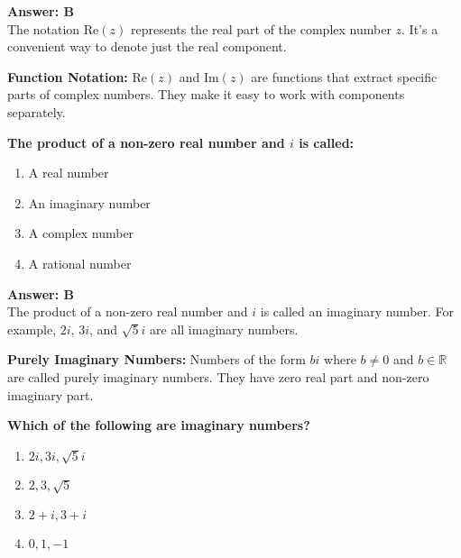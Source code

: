 \documentclass[12pt,a4paper]{article}
\begin{document}
\begin{answerstyle}
\textbf{Answer: B} \\
The notation \( \text{Re}(z) \) represents the real part of the complex number \( z \). It's a convenient way to denote just the real component.
\end{answerstyle}

\begin{conceptbox}
\textbf{Function Notation:} \( \text{Re}(z) \) and \( \text{Im}(z) \) are functions that extract specific parts of complex numbers. They make it easy to work with components separately.
\end{conceptbox}

\newpage
\begin{questiontitle}[MCQ 25]
\textbf{The product of a non-zero real number and \( i \) is called:}
\end{questiontitle}

\begin{partbox}[Options]
\begin{enumerate}[label=\Alph*.]
    \item A real number
    \item An imaginary number
    \item A complex number
    \item A rational number
\end{enumerate}
\end{partbox}

\begin{answerstyle}
\textbf{Answer: B} \\
The product of a non-zero real number and \( i \) is called an imaginary number. For example, \( 2i \), \( 3i \), and \( \sqrt{5}i \) are all imaginary numbers.
\end{answerstyle}

\begin{conceptbox}
\textbf{Purely Imaginary Numbers:} Numbers of the form \( bi \) where \( b \neq 0 \) and \( b \in \mathbb{R} \) are called purely imaginary numbers. They have zero real part and non-zero imaginary part.
\end{conceptbox}

\newpage
\begin{questiontitle}[MCQ 26]
\textbf{Which of the following are imaginary numbers?}
\end{questiontitle}

\begin{partbox}[Options]
\begin{enumerate}[label=\Alph*.]
    \item \( 2i, 3i, \sqrt{5}i \)
    \item \( 2, 3, \sqrt{5} \)
    \item \( 2 + i, 3 + i \)
    \item \( 0, 1, -1 \)
\end{enumerate}
\end{partbox}
\end{document}
